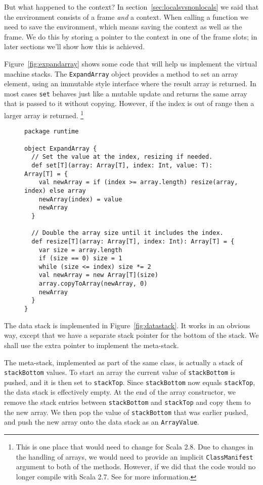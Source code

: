 But what happened to the context?
In section~\ref{sec:localsvsnonlocals} we said that the environment consists of
a frame \emph{and} a context.
When calling a function we need to save the environment,
which means saving the context as well as the frame.
We do this by storing a pointer to the context in one of the frame slots;
in later sections we'll show how this is achieved.

Figure~\ref{fig:expandarray} shows some code that will
help us implement the virtual machine stacks.
The \verb!ExpandArray! object provides a method to set an array element,
using an immutable style interface where the result array is returned.
In most cases \verb!set! behaves just like a mutable update
and returns the same array that is passed to it without copying.
However, if the index is out of range then a larger array is returned.%
\footnote{This is one place that would need to change for Scala 2.8.
Due to changes in the handling of arrays,
we would need to provide an implicit \texttt{ClassManifest} argument
to both of the methods.
However, if we did that the code would no longer compile with Scala 2.7.
See  for more information.}

\begin{figure}
\begin{verbatim}
package runtime

object ExpandArray {
  // Set the value at the index, resizing if needed.
  def set[T](array: Array[T], index: Int, value: T): Array[T] = {
    val newArray = if (index >= array.length) resize(array, index) else array
    newArray(index) = value
    newArray
  }

  // Double the array size until it includes the index.
  def resize[T](array: Array[T], index: Int): Array[T] = {
    var size = array.length
    if (size == 0) size = 1
    while (size <= index) size *= 2
    val newArray = new Array[T](size)
    array.copyToArray(newArray, 0)
    newArray
  }
}
\end{verbatim}
\getcaption
\end{figure}

The data stack is implemented in Figure~\ref{fig:datastack}.
It works in an obvious way,
except that we have a separate stack pointer for the bottom of the stack.
We shall use the extra pointer to implement the meta-stack.

The meta-stack, implemented as part of the same class,
is actually a stack of \verb!stackBottom! values.
To start an array the current value of \verb!stackBottom! is pushed,
and it is then set to \verb!stackTop!.
Since \verb!stackBottom! now equals \verb!stackTop!,
the data stack is effectively empty.
At the end of the array constructor,
we remove the stack entries between \verb!stackBottom! and \verb!stackTop!
and copy them to the new array.
We then pop the value of \verb!stackBottom! that was earlier pushed,
and push the new array onto the data stack as an \verb!ArrayValue!.

